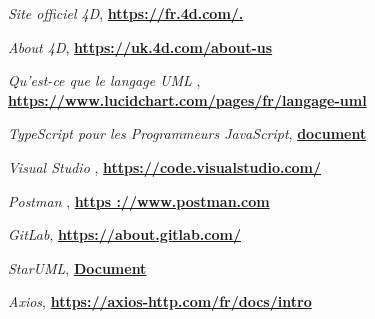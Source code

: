 
\renewcommand{\bibname}{Références}

\begin{thebibliography}{99}
    \emph{Site officiel 4D},
    \href{https://fr.4d.com/.}{\textbf{https://fr.4d.com/.}}
    
    \emph{About 4D},
    \href{https://uk.4d.com/about-us}{\textbf{https://uk.4d.com/about-us}}
    
  
     \emph{Qu'est-ce que le langage UML },
     \href{https://www.lucidchart.com/pages/fr/langage-uml}{\textbf{https://www.lucidchart.com/pages/fr/langage-uml}}
     
     \emph{TypeScript pour les Programmeurs JavaScript},
     \href{https://www.typescriptlang.org/fr/docs/handbook/typescript-in-5-minutes.html}{\textbf{document}}
     
     \emph{Visual Studio },
     \href{https://code.visualstudio.com/}{\textbf{https://code.visualstudio.com/}}
     
     \emph{Postman },
     \href{https ://www.postman.com}{\textbf{https ://www.postman.com}}
     
     \emph{GitLab},
     \href{https://about.gitlab.com/}{\textbf{https://about.gitlab.com/}}
     
     \emph{StarUML},
     \href{https://inf1410.teluq.ca/teluqDownload.php?file=2014/01/INF1410-PresentationStarUML.pdf}{\textbf{Document}}
     

     \emph{Axios},
     \href{https://axios-http.com/fr/docs/intro}{\textbf{https://axios-http.com/fr/docs/intro}}
     
    \end{thebibliography}
